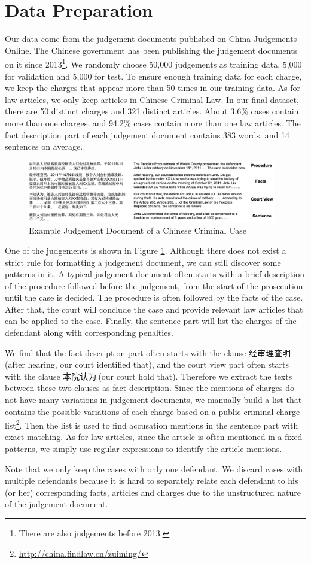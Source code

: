\section{Data Preparation} 
Our data come from the judgement documents published on China Judgements Online. The Chinese government has been publishing the judgement documents on it since 2013\footnote{There are also judgements before 2013.}. We randomly choose 50,000 judgements as training data, 5,000 for validation and 5,000 for test. To ensure enough training data for each charge, we keep the charges that appear more than 50 times in our training data. As for law articles, we only keep articles in Chinese Criminal Law. In our final dataset, there are 50 distinct charges and 321 distinct articles. About 3.6\% cases contain more than one charges, and 94.2\% cases contain more than one law articles. The fact description part of each judgement document contains 383 words, and 14 sentences on average.

\begin{figure}[htbp]
\begin{center}
\includegraphics[width=0.97\textwidth]{figures/case.png}	
\caption{Example Judgement Document of a Chinese Criminal Case}
\label{fig_example_case}
\end{center}
\end{figure}

One of the judgements is shown in Figure \ref{fig_example_case}. Although there does not exist a strict rule for formatting a judgement document, we can still discover some patterns in it. A typical judgement document often starts with a brief description of the procedure followed before the judgement, from the start of the prosecution until the case is decided. The procedure is often followed by the facts of the case. After that, the court will conclude the case and provide relevant law articles that can be applied to the case. Finally, the sentence part will list the charges of the defendant along with corresponding penalties. 

We find that the fact description part often starts with the clause 经审理查明$\ $(after hearing, our court identified that), and the court view part often starts with the clause 本院认为$\ $(our court hold that). Therefore we extract the texts between these two clauses as fact description. Since the mentions of charges do not have many variations in judgement documents, we manually build a list that contains the possible variations of each charge based on a public criminal charge list\footnote{\url{http://china.findlaw.cn/zuiming/}}. Then the list is used to find accusation mentions in the sentence part with exact matching. As for law articles, since the article is often mentioned in a fixed patterns, we simply use regular expressions to identify the article mentions. 

Note that we only keep the cases with only one defendant. We discard cases with multiple defendants because it is hard to separately relate each defendant to his (or her) corresponding facts, articles and charges due to the unstructured nature of the judgement document.